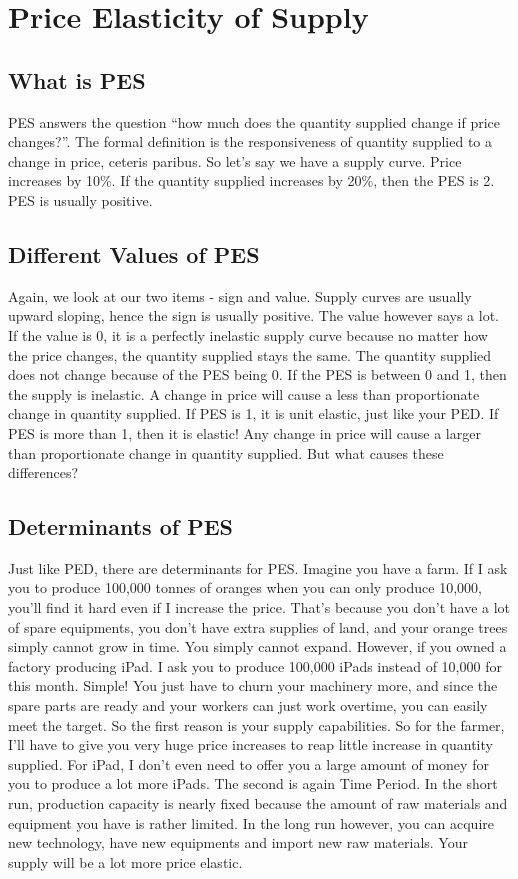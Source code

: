 \documentclass[DIV=classic,11pt,numbers=noenddot,listof=totoc,bibliography=totoc,parskip]{scrartcl}
\begin{document}
\section{Price Elasticity of Supply}
\subsection{What is PES}
PES answers the question “how much does the quantity supplied change if price changes?”. The formal definition is the responsiveness of quantity supplied to a change in price, ceteris paribus. So let’s say we have a supply curve. Price increases by 10\%. If the quantity supplied increases by 20\%, then the PES is 2. PES is usually positive.
\subsection{Different Values of PES}
Again, we look at our two items - sign and value. Supply curves are usually upward sloping, hence the sign is usually positive. The value however says a lot. If the value is 0, it is a perfectly inelastic supply curve because no matter how the price changes, the quantity supplied stays the same. The quantity supplied does not change because of the PES being 0. If the PES is between 0 and 1, then the supply is inelastic. A change in price will cause a less than proportionate change in quantity supplied. If PES is 1, it is unit elastic, just like your PED. If PES is more than 1, then it is elastic! Any change in price will cause a larger than proportionate change in quantity supplied. But what causes these differences?
\subsection{Determinants of PES}
Just like PED, there are determinants for PES. Imagine you have a farm. If I ask you to produce 100,000 tonnes of oranges when you can only produce 10,000, you’ll find it hard even if I increase the price. That’s because you don’t have a lot of spare equipments, you don’t have extra supplies of land, and your orange trees simply cannot grow in time. You simply cannot expand. However, if you owned a factory producing iPad. I ask you to produce 100,000 iPads instead of 10,000 for this month. Simple! You just have to churn your machinery more, and since the spare parts are ready and your workers can just work overtime, you can easily meet the target. So the first reason is your supply capabilities. So for the farmer, I’ll have to give you very huge price increases to reap little increase in quantity supplied. For iPad, I don’t even need to offer you a large amount of money for you to produce a lot more iPads. The second is again Time Period. In the short run, production capacity is nearly fixed because the amount of raw materials and equipment you have is rather limited. In the long run however, you can acquire new technology, have new equipments and import new raw materials. Your supply will be a lot more price elastic.
\end{document}
